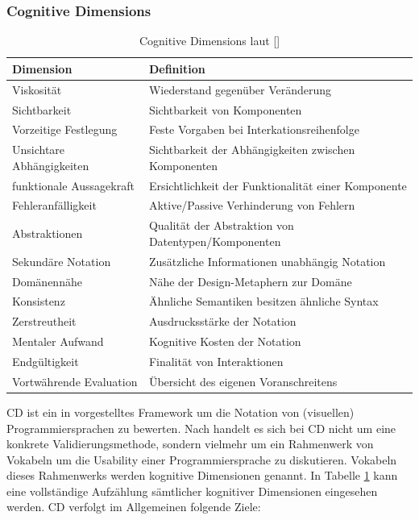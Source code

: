 \subsubsection{Cognitive Dimensions}
\begin{table}[h]
\centering
\begin{tabularx}{\textwidth}{lX}
\hline
\rowcolor[HTML]{EFEFEF} 
Dimension                 & Definition                                           \\ \hline
Viskosität                & Wiederstand gegenüber Veränderung                    \\ \hline
Sichtbarkeit              & Sichtbarkeit von Komponenten                         \\ \hline
Vorzeitige Festlegung     & Feste Vorgaben bei Interkationsreihenfolge           \\ \hline
Unsichtare Abhängigkeiten & Sichtbarkeit der Abhängigkeiten zwischen Komponenten \\ \hline
funktionale Aussagekraft  & Ersichtlichkeit der Funktionalität einer Komponente  \\ \hline
Fehleranfälligkeit        & Aktive/Passive Verhinderung von Fehlern              \\ \hline
Abstraktionen             & Qualität der Abstraktion von Datentypen/Komponenten  \\ \hline
Sekundäre Notation        & Zusätzliche Informationen unabhängig Notation        \\ \hline
Domänennähe               & Nähe der Design-Metaphern zur Domäne                 \\ \hline
Konsistenz                & Ähnliche Semantiken besitzen ähnliche Syntax         \\ \hline
Zerstreutheit             & Ausdrucksstärke der Notation                         \\ \hline
Mentaler Aufwand          & Kognitive Kosten der Notation                        \\ \hline
Endgültigkeit             & Finalität von Interaktionen                          \\ \hline
Vortwährende Evaluation   & Übersicht des eigenen Voranschreitens                \\ \hline
\end{tabularx}
\caption{Cognitive Dimensions laut [\cite{blackwell2003notational}]}
\label{tab:cognitivedimensions}
\end{table}
\acl{CD} ist ein in \cite{blackwell2003notational} vorgestelltes Framework um die Notation von (visuellen) Programmiersprachen zu bewerten. Nach \cite{blackwell2003notational} handelt es sich bei \ac{CD} nicht um eine konkrete Validierungsmethode, sondern vielmehr um ein Rahmenwerk von Vokabeln um die Usability einer Programmiersprache zu diskutieren. Vokabeln dieses Rahmenwerks werden kognitive Dimensionen genannt. In Tabelle \ref{tab:cognitivedimensions} kann eine vollständige Aufzählung sämtlicher kognitiver Dimensionen eingesehen werden. \ac{CD} verfolgt im Allgemeinen folgende Ziele:

